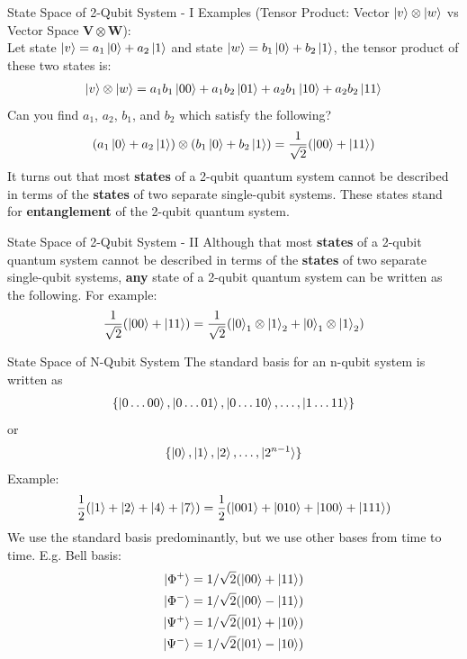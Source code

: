 \documentclass{beamer}
\begin{document}
\begin{frame}{State Space of 2-Qubit System - I}
{  Examples (Tensor Product: Vector $\ket{v} \otimes \ket{w}$ vs Vector Space $\mathbf{V} \otimes \mathbf{W}$): \\
  Let state $\ket{v}=a_1\ket0 + a_2\ket1$ and state $\ket{w}=b_1\ket0 + b_2\ket1$, the tensor product of these two states is:
  \begin{align*}
    \ket{v} \otimes \ket{w} = a_1b_1\ket{00} + a_1b_2\ket{01} + a_2b_1\ket{10} + a_2b_2\ket{11}
  \end{align*}
  Can you find $a_1$, $a_2$, $b_1$, and $b_2$ which satisfy the following?
  \begin{align*}
  (a_1\ket0 + a_2\ket1) \otimes (b_1\ket0 + b_2\ket1) = \frac{1}{\sqrt2}(\ket{00} + \ket{11})
  \end{align*}
  It turns out that most \textbf{states} of a 2-qubit quantum system cannot be described in terms of the \textbf{states} of two separate single-qubit systems.
  These states stand for \textbf{entanglement} of the 2-qubit quantum system.
  }%
\end{frame}

\begin{frame}{State Space of 2-Qubit System - II}
  Although that most \textbf{states} of a 2-qubit quantum system cannot be described in terms of the \textbf{states} of two separate single-qubit systems,
  \textbf{any} state of a 2-qubit quantum system can be written as the following. For example:
  \begin{align*}
    \frac{1}{\sqrt{2}} (\ket{00} + \ket{11}) = \frac{1}{\sqrt{2}} ( \ket{0}_1 \otimes \ket{1}_2 +  \ket{0}_1 \otimes \ket{1}_2)
  \end{align*}
\end{frame}

\begin{frame}{State Space of N-Qubit System}
  {\tiny
  The standard basis for an n-qubit system is written as
  \begin{align*}
    \{\ket{0\dots00}, \ket{0\dots01}, \ket{0\dots10}, \dots, \ket{1\dots11}\}
  \end{align*}
  or
  \begin{align*}
    \{\ket{0}, \ket{1}, \ket{2}, \dots, \ket{2^{n-1}}\}
  \end{align*}
  Example:
  \begin{align*}
    \frac{1}{2} (\ket{1} + \ket{2} + \ket{4} + \ket{7}) = \frac{1}{2} (\ket{001} + \ket{010} + \ket{100} + \ket{111})
  \end{align*}
  We use the standard basis predominantly, but we use other bases from time to time. E.g. Bell basis:
  \begin{align*}
    \ket{\Phi^+} &= 1/\sqrt2(\ket{00} + \ket{11}) \\
    \ket{\Phi^-} &= 1/\sqrt2(\ket{00} - \ket{11}) \\
    \ket{\Psi^+} &= 1/\sqrt2(\ket{01} + \ket{10}) \\
    \ket{\Psi^-} &= 1/\sqrt2(\ket{01} - \ket{10})
  \end{align*}
  }%
\end{frame}
\end{document}

